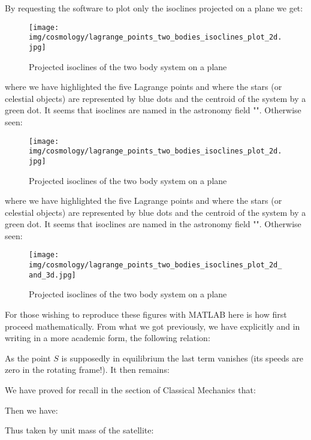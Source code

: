 	By requesting the software to plot only the isoclines projected on a plane we get:
	\begin{figure}[H]
		\begin{center}
		\texttt{[image: img/cosmology/lagrange\_points\_two\_bodies\_isoclines\_plot\_2d.jpg]}
		\end{center}	
		\caption{Projected isoclines of the two body system on a plane}
	\end{figure}
	where we have highlighted the five Lagrange points and where the stars (or celestial objects) are represented by blue dots and the centroid of the system by a green dot. It seems that isoclines are named in the astronomy field "". Otherwise seen:
	\begin{figure}[H]
		\begin{center}
		\texttt{[image: img/cosmology/lagrange\_points\_two\_bodies\_isoclines\_plot\_2d.jpg]}
		\end{center}	
		\caption{Projected isoclines of the two body system on a plane}
	\end{figure}
	where we have highlighted the five Lagrange points and where the stars (or celestial objects) are represented by blue dots and the centroid of the system by a green dot. It seems that isoclines are named in the astronomy field "". Otherwise seen:
	\begin{figure}[H]
		\begin{center}
		\texttt{[image: img/cosmology/lagrange\_points\_two\_bodies\_isoclines\_plot\_2d\_and\_3d.jpg]}
		\end{center}	
		\caption{Projected isoclines of the two body system on a plane}
	\end{figure}
	For those wishing to reproduce these figures with MATLAB here is how first proceed mathematically. From what we got previously, we have explicitly and in writing in a more academic form, the following relation:
	
	As the point $S$ is supposedly in equilibrium the last term vanishes (its speeds are zero in the rotating frame!). It then remains:
	
	We have proved for recall in the section of Classical Mechanics that:
	
	Then we have:
	
	Thus taken by unit mass of the satellite:
	
